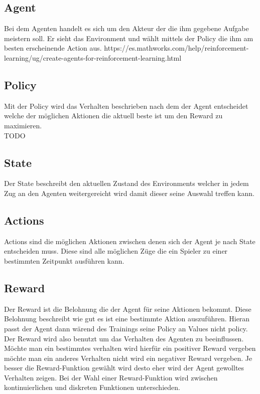 \subsection{Agent}
Bei dem Agenten handelt es sich um den Akteur der die ihm gegebene Aufgabe meistern soll. Er sieht das Environment und wählt mittels der Policy die ihm am besten erscheinende Action aus.
https://es.mathworks.com/help/reinforcement-learning/ug/create-agents-for-reinforcement-learning.html

\subsection{Policy}
Mit der Policy wird das Verhalten beschrieben nach dem der Agent entscheidet welche der möglichen Aktionen die aktuell beste ist um den Reward zu maximieren.\\
\colorbox{red!30}{TODO} %

\subsection{State}
Der State beschreibt den aktuellen Zustand des Environments welcher in jedem Zug  an den Agenten weitergereicht wird damit dieser seine Auswahl treffen kann. 

\subsection{Actions}
Actions sind die möglichen Aktionen zwischen denen sich der Agent je nach State entscheiden muss. Diese sind alle möglichen Züge die ein Spieler zu einer bestimmten Zeitpunkt ausführen kann.

\subsection{Reward}
Der Reward ist die Belohnung die der Agent für seine Aktionen bekommt. Diese Belohnung beschreibt wie gut es ist eine bestimmte Aktion auszuführen. Hieran passt der Agent dann wärend des Trainings seine Policy an \colorbox{red!30}{Values nicht policy}. Der Reward wird also benutzt um das Verhalten des Agenten zu beeinflussen. Möchte man ein bestimmtes verhalten wird hierfür ein positiver Reward vergeben möchte man ein anderes Verhalten nicht wird ein negativer Reward vergeben. Je besser die  Reward-Funktion gewählt wird desto eher wird der Agent gewolltes Verhalten zeigen. Bei der Wahl einer Reward-Funktion wird zwischen kontinuierlichen und diskreten Funktionen unterschieden.\\




